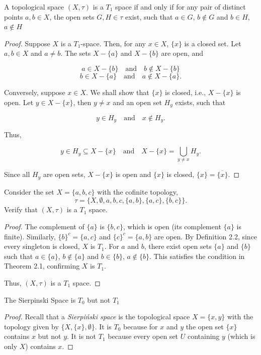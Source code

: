 \documentclass[12pt]{article} %
\begin{document}
\begin{theorem} \label{T1th}
    A topological space $(X,\tau)$ is a $T_1$ space if and only if for any pair of distinct points $a,b \in X$, the open sets $G,H \in \tau$ exist, such that $a\in G$, $b \notin G$ and $b\in H$, $a\notin H$
\end{theorem}
\begin{proof}
    Suppose $X$ is a $T_1$-space. Then, for any $x\in X$, $\{x\}$ is a closed set. Let $a,b\in X$ and $a\neq b$. The sets $X-\{a\}$ and $X-\{b\}$ are open, and 

\[
a \in X - \{b\} \quad \text{and} \quad b \notin X - \{b\}
\]
\[
b \in X - \{a\} \quad \text{and} \quad a \notin X - \{a\}.
\]

Conversely, suppose \( x \in X \). We shall show that \( \{x\} \) is closed, i.e., \( X - \{x\} \) is open.
Let \( y \in X - \{x\} \), then \( y \ne x \) and an open set \( H_y \) exists, such that

\[
y \in H_y \quad \text{and} \quad x \notin H_y.
\]

Thus,

\[
y \in H_y \subseteq X - \{x\} \quad \text{and} \quad X - \{x\} = \bigcup_{y \ne x} H_y.
\]

Since all \( H_y \) are open sets, \( X - \{x\} \) is open and \( \{x\} \) is closed, \( \{x\} = \overline{\{x\}} \).


\end{proof}

\begin{example} Consider the set $X=\{a,b,c\}$ with the cofinite topology, $$\tau=\{X,\emptyset,{a},{b},{c},\{a,b\},\{a,c\},\{b,c\}\}.$$ Verify that $(X,\tau)$ is a $T_1$ space.
\end{example}
\begin{proof} The complement of $\{a\}$ is $\{b,c\}$, which is open (its complement $\{a\}$ is finite). Similarly, $\{b\}^c=\{a,c\}$ and $\{c\}^c=\{a,b\}$ are open. By Definition 2.2, since every singleton is closed, $X$ is $T_1$.
For $a$ and $b$, there exist open sets $\{a\}$ and $\{b\}$ such that $a \in \{a\}$, $b\notin \{a\}$ and $b \in \{b\}$, $a\notin \{b\}$. This satisfies the condition in Theorem 2.1, confirming $X$ is $T_1$.

Thus, $(X,\tau)$ is a $T_1$ space.
\end{proof}

\begin{example}
The Sierpinski Space is $T_0$ but not $T_1$
\end{example}
\begin{proof}
      Recall that a \textit{{Sierpiński space}} is the topological space \( X = \{x, y\} \) with the topology given by \( \{X, \{x\}, \emptyset\} \). It is $T_0$ because for $x$ and $y$ the open set $\{x\}$ contains $x$ but not $y$. It is not $T_1$ because every open set $U$ containing $y$ (which is only $X$) contains $x$.

\end{proof}
\end{document}
